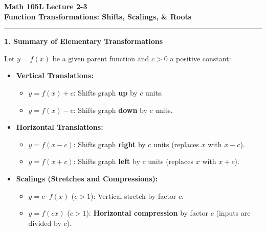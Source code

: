 \documentclass[10.5pt]{article}
\begin{document}
\noindent \textbf{\large Math 105L} \hfill \textbf{\large Lecture 2-3}\\[1pt]
{\textbf{\Large Function Transformations: Shifts, Scalings, \& Roots}}\\[-5pt]
\rule{\textwidth}{1.2pt}

\vspace{0.03in}

\textbf{\large 1. Summary of Elementary Transformations}

Let $y = f(x)$ be a given parent function and $c > 0$ a positive constant:

\begin{tcolorbox}[colback=boxbg, colframe=boxframe, boxrule=0.8pt, arc=3pt, left=8pt, right=8pt, top=4pt, bottom=4pt]
\begin{itemize}[leftmargin=1.2em, topsep=1pt, itemsep=3pt]
  \item \textbf{Vertical Translations:}
  \begin{itemize}[label=--]
    \item $y = f(x) + c$: Shifts graph \textbf{up} by $c$ units.
    \item $y = f(x) - c$: Shifts graph \textbf{down} by $c$ units.
  \end{itemize}
  \item \textbf{Horizontal Translations:}
  \begin{itemize}[label=--]
    \item $y = f(x - c)$: Shifts graph \textbf{right} by $c$ units (replaces $x$ with $x-c$).
    \item $y = f(x + c)$: Shifts graph \textbf{left} by $c$ units (replaces $x$ with $x+c$).
  \end{itemize}
  \item \textbf{Scalings (Stretches and Compressions):}
  \begin{itemize}[label=--]
    \item $y = c \cdot f(x)$ ($c > 1$): Vertical stretch by factor $c$.
    \item $y = f(c x)$ ($c > 1$): \textbf{Horizontal compression} by factor $c$ (inputs are divided by $c$).
  \end{itemize}
\end{itemize}
\end{tcolorbox}

\vspace{0.03in}
\end{document}
